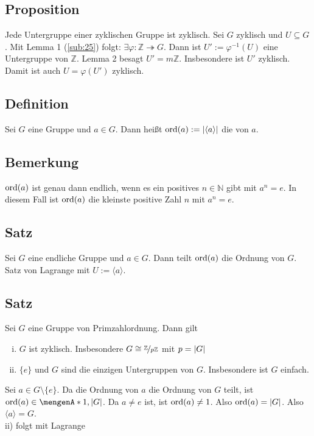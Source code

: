 \subsection[Proposition: Jede Untergruppe einer zyklischen Gruppe ist zyklisch]{Proposition} %
\label{sub:29}
Jede Untergruppe einer zyklischen Gruppe ist zyklisch.
Sei $G$ zyklisch und $U \subseteq G$. Mit Lemma 1 (\ref{sub:25}) folgt: $\exists \varphi : \mathds{Z} \twoheadrightarrow G$. Dann ist $U' := \varphi ^{-1}(U)$ eine Untergruppe von $\mathds{Z}$. Lemma
2 besagt $U'= m \mathds{Z}$. Insbesondere ist $U'$ zyklisch. Damit ist auch $U = \varphi(U')$ zyklisch. \bewende

\subsection[Definition: Ordnung eines Gruppenelements]{Definition} %
\label{sub:210}
Sei $G$ eine Gruppe und $a \in G$. Dann heißt $\ord(a) := \abs*{\langle a\rangle} $ die  von $a$.

\subsection[Bemerkung, wann $\ord(a)$ endlich ist]{Bemerkung} %
\label{sub:211}
$\ord (a)$ ist genau dann endlich, wenn es ein positives $n \in \mathds{N}$ gibt mit $a^n = e$. In diesem Fall ist $\ord (a)$ die kleinste positive Zahl $n$ mit $a^n=e$.

\subsection[Satz: Ordnung der Gruppen wird von $\ord(a)$ geteilt]{Satz} %
\label{sub:212}
Sei $G$ eine endliche Gruppe und $a \in G$. Dann teilt $\ord(a)$ die Ordnung von $G$.
Satz von Lagrange mit $U:= \langle a\rangle$. \bewende

\subsection[Satz über Gruppen von Primzahlordnung]{Satz} %
\label{sub:213}
Sei $G$ eine Gruppe von Primzahlordnung. Dann gilt
\begin{enumerate}[i)]
	\item $G$ ist zyklisch. Insbesondere $G \cong \nicefrac{\mathds{Z}}{p \mathds{Z}}$ mit $p = \abs*{G} $
	\item $\{e\}$ und $G$ sind die einzigen Untergruppen von $G$. Insbesondere ist $G$ einfach.
\end{enumerate}
Sei $a \in G \setminus \{e\}$. Da die Ordnung von $a$ die Ordnung von $G$ teilt, ist $\ord(a) \in \set{1, \abs*{G} } $. Da $a \not= e$ ist, ist $\ord(a) \not=1$. Also 
$\ord(a)= \abs*{G} $. Also $\langle a\rangle =G$.\\
ii) folgt mit Lagrange \bewende
\newpage

